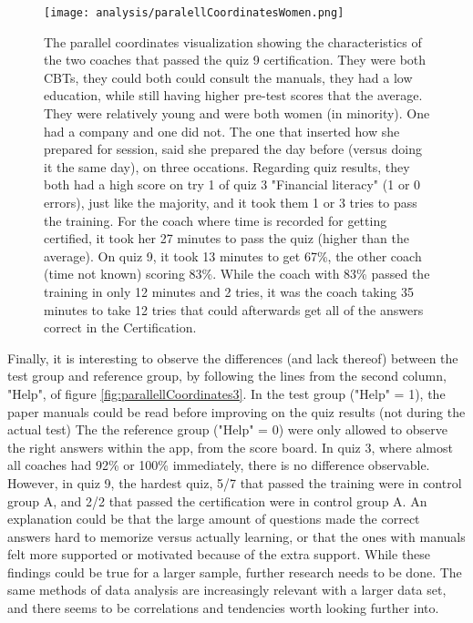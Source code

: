 \begin{figure}[h]
    \centering
    \texttt{[image: analysis/paralellCoordinatesWomen.png]}
    \caption{The parallel coordinates visualization showing the characteristics of the two coaches that passed the quiz 9 certification. They were both CBTs, they could both could consult the manuals, they had a low education, while still having higher pre-test scores that the average. They were relatively young and were both women (in minority). One had a company and one did not. The one that inserted how she prepared for session, said she prepared the day before (versus doing it the same day), on three occations. Regarding quiz results, they both had a high score on try 1 of quiz 3 "Financial literacy" (1 or 0 errors), just like the majority, and it took them 1 or 3 tries to pass the training. For the coach where time is recorded for getting certified, it took her 27 minutes to pass the quiz (higher than the average). On quiz 9, it took 13 minutes to get 67\%, the other coach (time not known) scoring 83\%. While the coach with 83\% passed the training in only 12 minutes and 2 tries, it was the coach taking 35 minutes to take 12 tries that could afterwards get all of the answers correct in the Certification.}
    \label{fig:quiz9pl}
\end{figure}

Finally, it is interesting to observe the differences (and lack thereof) between the test group and reference group, by following the lines from the second column, "Help", of figure \ref{fig:parallellCoordinates3}. In the test group ("Help" = 1), the paper manuals could be read before improving on the quiz results (not during the actual test) The the reference group ("Help" = 0) were only allowed to observe the right answers within the app, from the score board. In quiz 3, where almost all coaches had 92\% or 100\% immediately, there is no difference observable. However, in quiz 9, the hardest quiz, 5/7 that passed the training were in control group A, and 2/2 that passed the certification were in control group A. An explanation could be that the large amount of questions made the correct answers hard to memorize versus actually learning, or that the ones with manuals felt more supported or motivated because of the extra support. While these findings could be true for a larger sample, further research needs to be done. The same methods of data analysis are increasingly relevant with a larger data set, and there seems to be correlations and tendencies worth looking further into.
